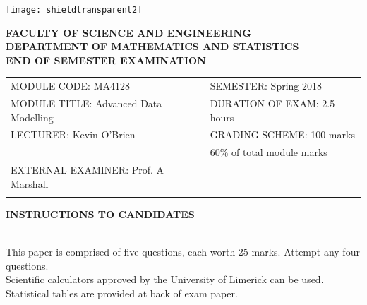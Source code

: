 \documentclass[a4paper,12pt]{article}
\begin{document}
	
	\begin{center}
		\texttt{[image: shieldtransparent2]}
	\end{center}
	
	\begin{center}
		\vspace{1cm}
		\large \bf {FACULTY OF SCIENCE AND ENGINEERING} \\[0.5cm]
		\normalsize DEPARTMENT OF MATHEMATICS AND STATISTICS \\[1.25cm]
		\large \bf {END OF SEMESTER EXAMINATION} \\[1.5cm]
	\end{center}
	
	\begin{tabular}{ll}
		MODULE CODE: MA4128 & SEMESTER: Spring 2018\\[1cm]
		MODULE TITLE: Advanced Data Modelling & DURATION OF EXAM: 2.5 hours \\[1cm]
		LECTURER: Kevin O'Brien & GRADING SCHEME: 100 marks\\
		& \phantom{GRADING SCHEME:} \footnotesize {60\% of total module marks}   \\[0.8cm]
		EXTERNAL EXAMINER: Prof. A Marshall & \\[1cm]
		\\[1cm]
	\end{tabular}
	\begin{center}
		{\bf INSTRUCTIONS TO CANDIDATES}
	\end{center}
	
	{\noindent \\ This paper is comprised of five questions, each worth 25 marks. Attempt any four questions.
		\\ Scientific calculators approved by the University of Limerick can be used. 
		\\ Statistical tables are provided at back of exam paper.
	}
	\normalsize
	\newpage

\end{document}
